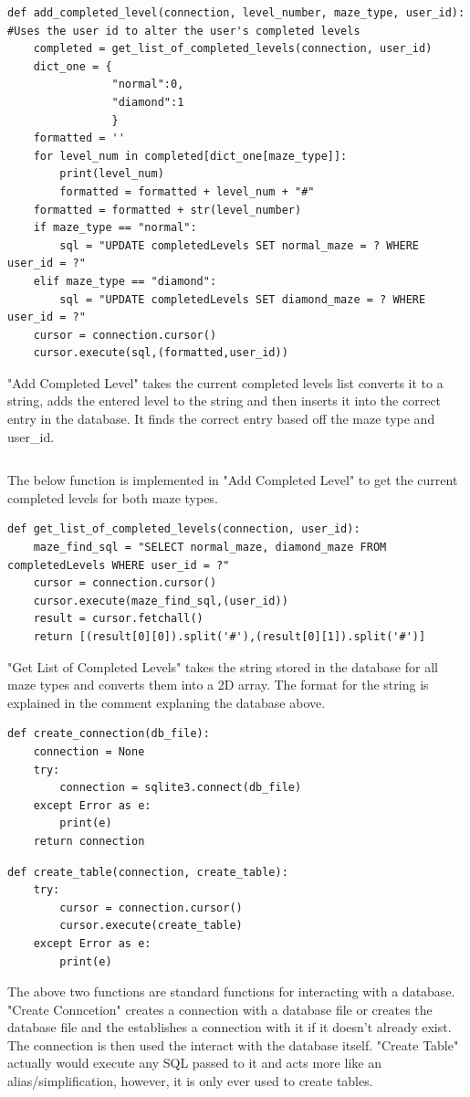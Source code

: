\begin{lstlisting}
def add_completed_level(connection, level_number, maze_type, user_id):    #Uses the user id to alter the user's completed levels
    completed = get_list_of_completed_levels(connection, user_id)
    dict_one = {
                "normal":0,
                "diamond":1
                }
    formatted = ''
    for level_num in completed[dict_one[maze_type]]:
        print(level_num)
        formatted = formatted + level_num + "#"
    formatted = formatted + str(level_number)
    if maze_type == "normal":
        sql = "UPDATE completedLevels SET normal_maze = ? WHERE user_id = ?"
    elif maze_type == "diamond":
        sql = "UPDATE completedLevels SET diamond_maze = ? WHERE user_id = ?"
    cursor = connection.cursor()
    cursor.execute(sql,(formatted,user_id))
\end{lstlisting}
"Add Completed Level" takes the current completed levels list converts it to a string,  adds the entered level to the string and then inserts
it into the correct entry in the database. It finds the correct entry based off the maze type and user\_id.
\begin{lstlisting}
\end{lstlisting}
The below function is implemented in "Add Completed Level" to get the current completed levels for both maze types.
\begin{lstlisting}
def get_list_of_completed_levels(connection, user_id):
    maze_find_sql = "SELECT normal_maze, diamond_maze FROM completedLevels WHERE user_id = ?"
    cursor = connection.cursor()
    cursor.execute(maze_find_sql,(user_id))
    result = cursor.fetchall()
    return [(result[0][0]).split('#'),(result[0][1]).split('#')]
\end{lstlisting}
"Get List of Completed Levels" takes the string stored in the database for all maze types and converts them into a 2D array. 
The format for the string is explained in the comment explaning the database above.

\clearpage
\begin{lstlisting}
def create_connection(db_file):
    connection = None
    try:
        connection = sqlite3.connect(db_file)
    except Error as e:
        print(e)
    return connection
\end{lstlisting}

\begin{lstlisting}
def create_table(connection, create_table):
    try:
        cursor = connection.cursor()
        cursor.execute(create_table)
    except Error as e:
        print(e)
\end{lstlisting}
The above two functions are standard functions for interacting with a database. "Create Conncetion" creates a connection with a database file or creates the
database file and the establishes a connection with it if it doesn't already exist. The connection is then used the interact with the database itself. "Create Table"
actually would execute any SQL passed to it and acts more like an alias/simplification, however, it is only ever used to create tables.

